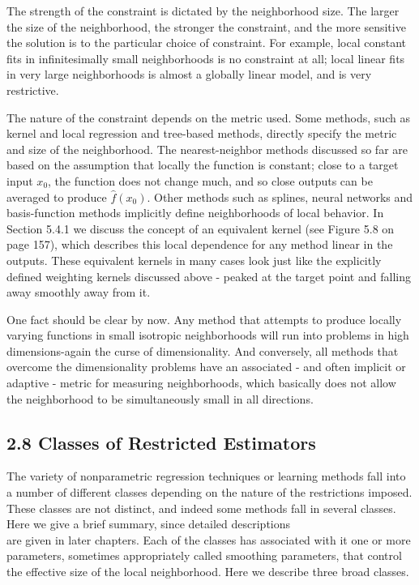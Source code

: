 \documentclass[10pt]{article}
\begin{document}
The strength of the constraint is dictated by the neighborhood size. The larger the size of the neighborhood, the stronger the constraint, and the more sensitive the solution is to the particular choice of constraint. For example, local constant fits in infinitesimally small neighborhoods is no constraint at all; local linear fits in very large neighborhoods is almost a globally linear model, and is very restrictive.

The nature of the constraint depends on the metric used. Some methods, such as kernel and local regression and tree-based methods, directly specify the metric and size of the neighborhood. The nearest-neighbor methods discussed so far are based on the assumption that locally the function is constant; close to a target input $x_{0}$, the function does not change much, and so close outputs can be averaged to produce $\hat{f}\left(x_{0}\right)$. Other methods such as splines, neural networks and basis-function methods implicitly define neighborhoods of local behavior. In Section 5.4.1 we discuss the concept of an equivalent kernel (see Figure 5.8 on page 157), which describes this local dependence for any method linear in the outputs. These equivalent kernels in many cases look just like the explicitly defined weighting kernels discussed above - peaked at the target point and falling away smoothly away from it.

One fact should be clear by now. Any method that attempts to produce locally varying functions in small isotropic neighborhoods will run into problems in high dimensions-again the curse of dimensionality. And conversely, all methods that overcome the dimensionality problems have an associated - and often implicit or adaptive - metric for measuring neighborhoods, which basically does not allow the neighborhood to be simultaneously small in all directions.

\subsection*{2.8 Classes of Restricted Estimators}
The variety of nonparametric regression techniques or learning methods fall into a number of different classes depending on the nature of the restrictions imposed. These classes are not distinct, and indeed some methods fall in several classes. Here we give a brief summary, since detailed descriptions\\
are given in later chapters. Each of the classes has associated with it one or more parameters, sometimes appropriately called smoothing parameters, that control the effective size of the local neighborhood. Here we describe three broad classes.
\end{document}
